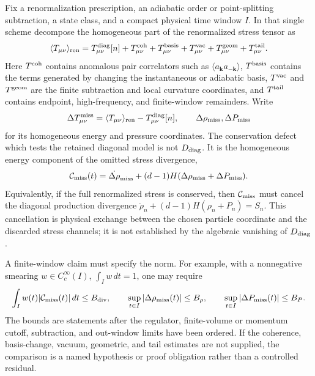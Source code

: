 \begin{controlledapproximation}
\label{ca:cosmology-omitted-stress-defect}
Fix a renormalization prescription, an adiabatic order or point-splitting
subtraction, a state class, and a compact physical time window \(I\).  In that
single scheme decompose the homogeneous part of the renormalized stress tensor
as
\begin{equation}
  \langle T_{\mu\nu}\rangle_{\rm ren}
  =
  T_{\mu\nu}^{\rm diag}[n]
  +T_{\mu\nu}^{\rm coh}
  +T_{\mu\nu}^{\rm basis}
  +T_{\mu\nu}^{\rm vac}
  +T_{\mu\nu}^{\rm geom}
  +T_{\mu\nu}^{\rm tail}.
  \label{eq:cosmology-ren-stress-diag-omitted-decomposition}
\end{equation}
Here \(T^{\rm coh}\) contains anomalous pair correlators such as
\(\langle a_{\mathbf k}a_{-\mathbf k}\rangle\), \(T^{\rm basis}\) contains the
terms generated by changing the instantaneous or adiabatic basis, \(T^{\rm vac}\)
and \(T^{\rm geom}\) are the finite subtraction and local curvature coordinates,
and \(T^{\rm tail}\) contains endpoint, high-frequency, and finite-window
remainders.  Write
\[
  \Delta T_{\mu\nu}^{\rm miss}
  =
  \langle T_{\mu\nu}\rangle_{\rm ren}-T_{\mu\nu}^{\rm diag}[n],
  \qquad
  \Delta\rho_{\rm miss},\Delta P_{\rm miss}
\]
for its homogeneous energy and pressure coordinates.  The conservation defect
which tests the retained diagonal model is not \(D_{\rm diag}\).  It is the
homogeneous energy component of the omitted stress divergence,
\begin{equation}
  {\mathcal C}_{\rm miss}(t)
  =
  \dot{\Delta\rho}_{\rm miss}
  +(d-1)H(\Delta\rho_{\rm miss}+\Delta P_{\rm miss}).
  \label{eq:cosmology-omitted-stress-divergence-defect}
\end{equation}
Equivalently, if the full renormalized stress is conserved, then
\({\mathcal C}_{\rm miss}\) must cancel the diagonal production divergence
\(\dot\rho_n+(d-1)H(\rho_n+P_n)=S_n\).  This cancellation is physical exchange
between the chosen particle coordinate and the discarded stress channels; it is
not established by the algebraic vanishing of \(D_{\rm diag}\).

A finite-window claim must specify the norm.  For example, with a nonnegative
smearing \(w\in C_c^\infty(I)\), \(\int_Iw\,dt=1\), one may require
\begin{equation}
  \int_Iw(t)|{\mathcal C}_{\rm miss}(t)|\,dt\le B_{\rm div},
  \qquad
  \sup_{t\in I}|\Delta\rho_{\rm miss}(t)|\le B_\rho,\qquad
  \sup_{t\in I}|\Delta P_{\rm miss}(t)|\le B_P .
  \label{eq:cosmology-omitted-stress-window-bounds}
\end{equation}
The bounds are statements after the regulator, finite-volume or momentum
cutoff, subtraction, and out-window limits have been ordered.  If the coherence,
basis-change, vacuum, geometric, and tail estimates are not supplied, the
comparison is a named hypothesis or proof obligation rather than a controlled
residual.
\end{controlledapproximation}

